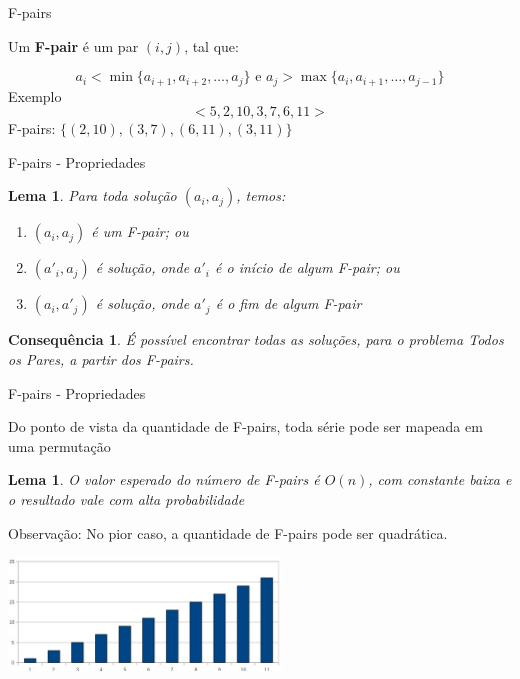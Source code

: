 \documentclass{beamer}
\newtheorem{lem}[thm]{Lema}
\newtheorem{cons}[thm]{Consequência}
\begin{document}
\begin{frame}{F-pairs}

Um \textbf{F-pair} é um par $(i, j)$, tal que:

		$$ a_i < \min\{ a_{i+1}, a_{i+2}, \ldots, a_j \}
								\text{ e }
			 a_j > \max\{ a_i, a_{i+1}, \ldots, a_{j-1} \}
		$$
Exemplo
		$$<5, 2, 10, 3, 7, 6, 11>$$
F-pairs: $\{(2, 10), (3, 7), (6, 11), (3, 11)\}$

\end{frame}


\begin{frame}{F-pairs - Propriedades}

\begin{lem}
Para toda solução $(a_i, a_j)$, temos:
\begin{enumerate}
\item $(a_i, a_j)$ é um F-pair; ou
\item $(a'_i, a_j)$ é solução, onde $a'_i$ é o início de algum F-pair; ou
\item $(a_i, a'_j)$ é solução, onde $a'_j$ é o fim de algum F-pair
\end{enumerate}
\end{lem}

\bigskip

\begin{cons}
É possível encontrar todas as soluções, para o problema \textit{Todos os Pares},
a partir dos F-pairs.
\end{cons}

\end{frame}

\begin{frame}{F-pairs - Propriedades}

Do ponto de vista da quantidade de F-pairs, toda série
pode ser mapeada em uma permutação

\begin{lem}
O valor esperado do número de F-pairs é $O(n)$,
com constante baixa e o resultado vale com
alta probabilidade
\end{lem}
\bigskip
Observação: No pior caso, a quantidade de F-pairs pode ser quadrática.

\begin{center}
\includegraphics[height=3.0cm]{badcase.jpg}
\end{center}

\end{frame}
\end{document}
